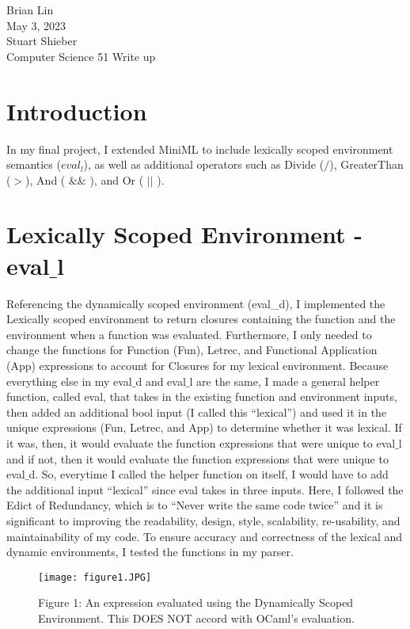 \documentclass[answers]{exam}
\begin{document}
\noindent Brian Lin \\
May 3, 2023 \\
Stuart Shieber \\
Computer Science 51 Write up \\

\section{Introduction}
In my final project, I extended MiniML to include lexically scoped environment semantics ($eval_l$), as well as additional operators such as Divide ($/$), GreaterThan ($>$), And ( $\&\&$ ), and Or ( $||$ ). 


\section{Lexically Scoped Environment - eval$\_$l}

Referencing the dynamically scoped environment (eval\_d), I implemented the Lexically scoped environment to return closures containing the function and the environment when a function was evaluated. Furthermore, I only needed to change the functions for Function (Fun), Letrec, and Functional Application (App) expressions to account for Closures for my lexical environment. Because everything else in my eval$\_$d and eval$\_$l are the same, I made a general helper function, called eval, that takes in the existing function and environment inputs, then added an additional bool input (I called this “lexical”) and used it in the unique expressions (Fun, Letrec, and App) to determine whether it was lexical. If it was, then, it would evaluate the function expressions that were unique to eval$\_$l and if not, then it would evaluate the function expressions that were unique to eval$\_$d. So, everytime I called the helper function on itself, I would have to add the additional input “lexical” since eval takes in three inputs. Here, I followed the Edict of Redundancy, which is to “Never write the same code twice” and it is significant to improving the readability, design, style, scalability, re-usability, and maintainability of my code. To ensure accuracy and correctness of the lexical and dynamic environments, I tested the functions in my  parser. 

\begin{figure}[!h]
	\centering
	\texttt{[image: figure1.JPG]}
	\caption{Figure 1: An expression evaluated using the Dynamically Scoped Environment. This DOES NOT accord with OCaml’s evaluation. }
	\label{kalman}
\end{figure}
\end{document}
